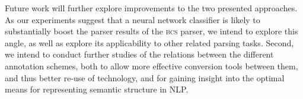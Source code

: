 \documentclass[11pt]{article}
\begin{document}
Future work will further explore improvements to the two presented approaches.
As our experiments suggest that a neural network classifier is likely to substantially boost the parser
results of the \textsc{bcs} parser, we intend to explore this angle, as well as explore its applicability
to other related parsing tasks. Second, we intend to conduct further studies of the relations
between the different annotation schemes, both to allow more effective conversion tools between
them, and thus better re-use of technology, and for gaining insight into the optimal means for
representing semantic structure in NLP.






\end{document}
